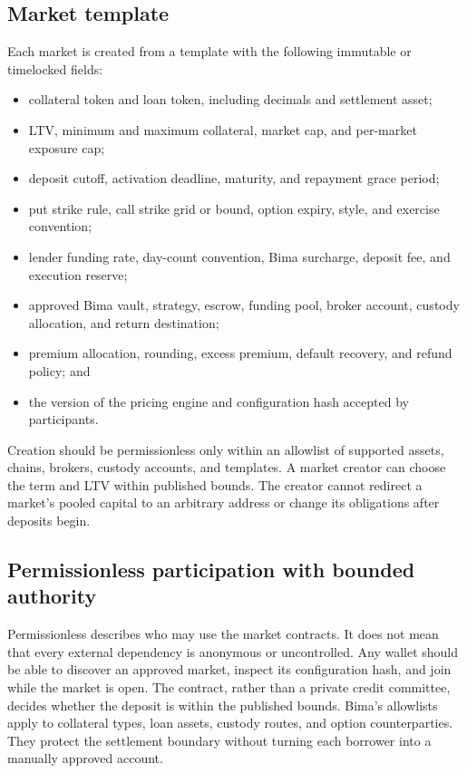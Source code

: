 \documentclass[11pt,oneside]{article}
\begin{document}
\subsection{Market template}

Each market is created from a template with the following immutable or timelocked fields:

\begin{itemize}
\item collateral token and loan token, including decimals and settlement asset;
\item LTV, minimum and maximum collateral, market cap, and per-market exposure cap;
\item deposit cutoff, activation deadline, maturity, and repayment grace period;
\item put strike rule, call strike grid or bound, option expiry, style, and exercise convention;
\item lender funding rate, day-count convention, Bima surcharge, deposit fee, and execution reserve;
\item approved Bima vault, strategy, escrow, funding pool, broker account, custody allocation, and return destination;
\item premium allocation, rounding, excess premium, default recovery, and refund policy; and
\item the version of the pricing engine and configuration hash accepted by participants.
\end{itemize}

Creation should be permissionless only within an allowlist of supported assets, chains, brokers, custody accounts, and templates. A market creator can choose the term and LTV within published bounds. The creator cannot redirect a market's pooled capital to an arbitrary address or change its obligations after deposits begin.

\subsection{Permissionless participation with bounded authority}

Permissionless describes who may use the market contracts. It does not mean
that every external dependency is anonymous or uncontrolled. Any wallet should
be able to discover an approved market, inspect its configuration hash, and
join while the market is open. The contract, rather than a private credit
committee, decides whether the deposit is within the published bounds. Bima's
allowlists apply to collateral types, loan assets, custody routes, and option
counterparties. They protect the settlement boundary without turning each
borrower into a manually approved account.
\end{document}
